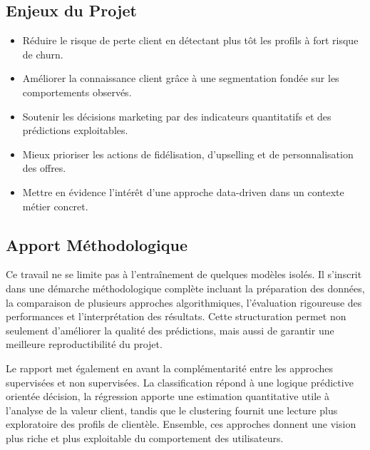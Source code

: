 \documentclass[11pt,a4paper]{article}
\begin{document}
\subsection{Enjeux du Projet}
\begin{itemize}
    \item Réduire le risque de perte client en détectant plus tôt les profils à fort risque de churn.
    \item Améliorer la connaissance client grâce à une segmentation fondée sur les comportements observés.
    \item Soutenir les décisions marketing par des indicateurs quantitatifs et des prédictions exploitables.
    \item Mieux prioriser les actions de fidélisation, d'upselling et de personnalisation des offres.
    \item Mettre en évidence l'intérêt d'une approche data-driven dans un contexte métier concret.
\end{itemize}

\subsection{Apport Méthodologique}
Ce travail ne se limite pas à l'entraînement de quelques modèles isolés. Il s'inscrit dans une démarche méthodologique complète incluant la préparation des données, la comparaison de plusieurs approches algorithmiques, l'évaluation rigoureuse des performances et l'interprétation des résultats. Cette structuration permet non seulement d'améliorer la qualité des prédictions, mais aussi de garantir une meilleure reproductibilité du projet.

Le rapport met également en avant la complémentarité entre les approches supervisées et non supervisées. La classification répond à une logique prédictive orientée décision, la régression apporte une estimation quantitative utile à l'analyse de la valeur client, tandis que le clustering fournit une lecture plus exploratoire des profils de clientèle. Ensemble, ces approches donnent une vision plus riche et plus exploitable du comportement des utilisateurs.
\end{document}

